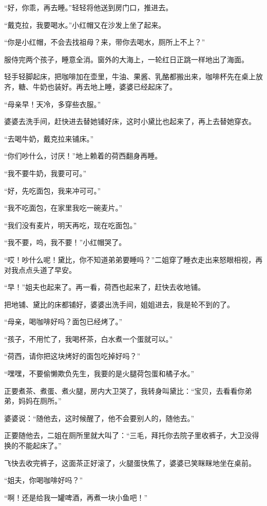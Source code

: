 \par “好，你乖，再去睡。”轻轻将他送到房门口，推进去。
\par “戴克拉，我要喝水。”小红帽又在沙发上坐了起来。
\par “你是小红帽，不会去找祖母？来，带你去喝水，厕所上不上？”
\par 服侍完两个孩子，睡意全消。窗外的大海上，一轮红日正跳一样地出了海面。
\par 轻手轻脚起床，把咖啡加在壶里，牛油、果酱、乳酪都搬出来，咖啡杯先在桌上放齐，糖、牛奶也装好。再去地上睡，婆婆已经起床了。
\par “母亲早！天冷，多穿些衣服。”
\par 婆婆去洗手间，赶快进去替她铺好床，这时小黛比也起来了，再上去替她穿衣。
\par “去喝牛奶，戴克拉来铺床。”
\par “你们吵什么，讨厌！”地上赖着的荷西翻身再睡。
\par “我不要牛奶，我要可可。”
\par “好，先吃面包，我来冲可可。”
\par “我不吃面包，在家里我吃一碗麦片。”
\par “我们没有麦片，明天再吃，现在吃面包。”
\par “我不要，呜，我不要！”小红帽哭了。
\par “哎！吵什么呢！黛比，你不知道弟弟要睡吗？”二姐穿了睡衣走出来怒眼相视，再对我点点头道了早安。
\par “早！”姐夫也起来了。再一看，荷西也起来了，赶快去收地铺。
\par 把地铺、黛比的床都铺好，婆婆出洗手间，姐姐进去，我是轮不到的了。
\par “母亲，喝咖啡好吗？面包已经烤了。”
\par “孩子，不用忙了，我喝杯茶，白水煮一个蛋就可以。”
\par “荷西，请你把这块烤好的面包吃掉好吗？”
\par “嘿嘿，不要偷懒欺负先生，我要的是火腿荷包蛋和橘子水。”
\par 正要煮茶、煮蛋、煮火腿，房内大卫哭了，我转身叫黛比：“宝贝，去看看你弟弟，妈妈在厕所。”
\par 婆婆说：“随他去，这时候醒了，他不会要别人的，随他去。”
\par 正要随他去，二姐在厕所里就大叫了：“三毛，拜托你去院子里收裤子，大卫没得换的不能起床了。”
\par 飞快去收完裤子，这面茶正好滚了，火腿蛋快焦了，婆婆已笑眯眯地坐在桌前。
\par “姐夫，你喝咖啡好吗？”
\par “啊！还是给我一罐啤酒，再煮一块小鱼吧！”
